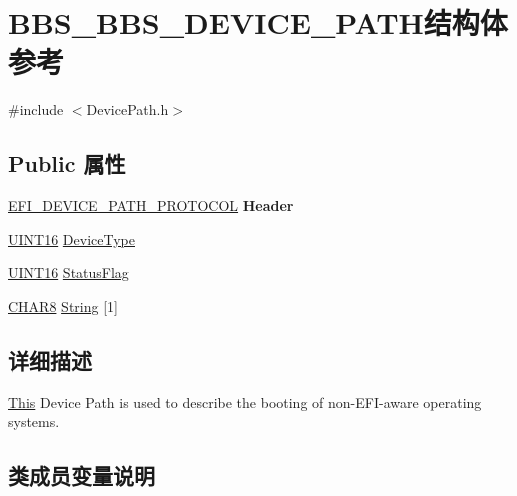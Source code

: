 \hypertarget{struct_b_b_s___b_b_s___d_e_v_i_c_e___p_a_t_h}{}\section{B\+B\+S\+\_\+\+B\+B\+S\+\_\+\+D\+E\+V\+I\+C\+E\+\_\+\+P\+A\+T\+H结构体 参考}
\label{struct_b_b_s___b_b_s___d_e_v_i_c_e___p_a_t_h}


{\ttfamily \#include $<$Device\+Path.\+h$>$}

\subsection*{Public 属性}
\begin{DoxyCompactItemize}
\item 
\mbox{\label{struct_b_b_s___b_b_s___d_e_v_i_c_e___p_a_t_h_a408ac7db26e8460ad2c04299e76647db}} 
\hyperlink{struct_e_f_i___d_e_v_i_c_e___p_a_t_h___p_r_o_t_o_c_o_l}{E\+F\+I\+\_\+\+D\+E\+V\+I\+C\+E\+\_\+\+P\+A\+T\+H\+\_\+\+P\+R\+O\+T\+O\+C\+OL} {\bfseries Header}
\item 
\hyperlink{_processor_bind_8h_a09f1a1fb2293e33483cc8d44aefb1eb1}{U\+I\+N\+T16} \hyperlink{struct_b_b_s___b_b_s___d_e_v_i_c_e___p_a_t_h_ad33e526d73a5358f190cc1c38e91cf87}{Device\+Type}
\item 
\hyperlink{_processor_bind_8h_a09f1a1fb2293e33483cc8d44aefb1eb1}{U\+I\+N\+T16} \hyperlink{struct_b_b_s___b_b_s___d_e_v_i_c_e___p_a_t_h_ad4b38c52e35b54f1c29c743d22d38909}{Status\+Flag}
\item 
\hyperlink{_processor_bind_8h_a86fec2d8279568b834836c4ba2b80574}{C\+H\+A\+R8} \hyperlink{struct_b_b_s___b_b_s___d_e_v_i_c_e___p_a_t_h_a5977376aa9cef19ecb972b1119bc5d0e}{String} \mbox{[}1\mbox{]}
\end{DoxyCompactItemize}


\subsection{详细描述}
\hyperlink{namespace_this}{This} Device Path is used to describe the booting of non-\/\+E\+F\+I-\/aware operating systems. 

\subsection{类成员变量说明}
\mbox{\label{struct_b_b_s___b_b_s___d_e_v_i_c_e___p_a_t_h_ad33e526d73a5358f190cc1c38e91cf87}} 
